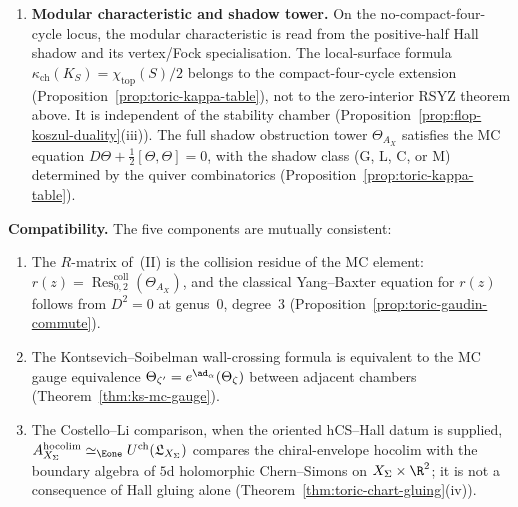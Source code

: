 \begin{theorem}
\begin{enumerate}[label=\textup{(\Roman*)}]
 \item \textbf{Modular characteristic and shadow tower.}
 On the no-compact-four-cycle locus, the modular characteristic is read
 from the positive-half Hall shadow and its vertex/Fock specialisation.
 The local-surface formula
 $\kappa_{\mathrm{ch}}(K_S)=\chi_{\mathrm{top}}(S)/2$
 belongs to the compact-four-cycle extension
 \textup{(}Proposition~\textup{\ref{prop:toric-kappa-table}}\textup{)}, not
 to the zero-interior RSYZ theorem above.
 It is independent of the stability chamber
 \textup{(}Proposition~\textup{\ref{prop:flop-koszul-duality}(iii)}\textup{)}.
 The full shadow obstruction tower $\Theta_{A_X}$
 satisfies the MC equation
 $D\Theta + \frac{1}{2}[\Theta, \Theta] = 0$,
 with the shadow class \textup{(}G, L, C, or M\textup{)} determined
 by the quiver combinatorics
 \textup{(}Proposition~\textup{\ref{prop:toric-kappa-table}}\textup{)}.
\end{enumerate}

\medskip\noindent\textbf{Compatibility.}
The five components are mutually consistent:
\begin{enumerate}[label=\textup{(\alph*)}]
 \item The $R$-matrix of~\textup{(II)} is the collision
 residue of the MC element:
 $r(z) = \operatorname{Res}^{\mathrm{coll}}_{0,2}(\Theta_{A_X})$,
 and the classical Yang--Baxter equation for $r(z)$
 follows from $D^2 = 0$ at genus~$0$, degree~$3$
 \textup{(}Proposition~\textup{\ref{prop:toric-gaudin-commute}}\textup{)}.
 \item The Kontsevich--Soibelman wall-crossing formula
 is equivalent to the MC gauge equivalence
 $\Theta_{\zeta'} = e^{\ad_\alpha}(\Theta_\zeta)$
 between adjacent chambers
 \textup{(}Theorem~\textup{\ref{thm:ks-mc-gauge}}\textup{)}.
 \item The Costello--Li comparison, when the oriented hCS--Hall datum is
 supplied,
 $A_{X_\Sigma}^{\mathrm{hocolim}}
 \simeq_{\Eone} U^{\mathrm{ch}}(\mathfrak{L}_{X_\Sigma})$
 compares the chiral-envelope hocolim with the boundary algebra
 of $5$d holomorphic Chern--Simons on $X_\Sigma \times \R^2$; it is not
 a consequence of Hall gluing alone
 \textup{(}Theorem~\textup{\ref{thm:toric-chart-gluing}(iv)}\textup{)}.
\end{enumerate}
\end{theorem}


